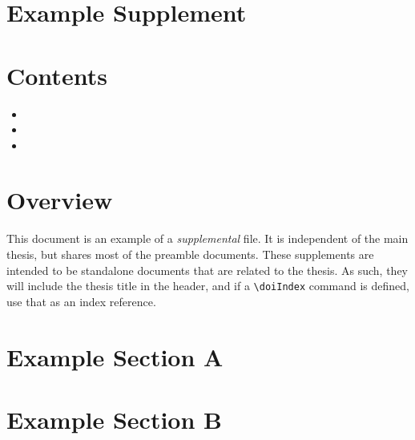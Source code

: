 \documentclass[hidelinks,a4paper,11pt,openany]{article}
\newcommand{\supplementName}{Example Supplement}
\begin{document}
\section*{\supplementName}




\section*{Contents}
\begin{itemize}
	\item {}
	\item {}
	\item {}
\end{itemize}


\section{Overview}
\label{\labelOverview}

This document is an example of a \textit{supplemental} file.  It is independent of the main thesis, but shares most of the preamble documents.  These supplements are intended to be standalone documents that are related to the thesis.  As such, they will include the thesis title in the header, and if a \texttt{{\textbackslash}doiIndex} command is defined, use that as an index reference.



\section{Example Section A}
\label{\labelA}

\lipsum[1-3]


\section{Example Section B}
\label{\labelB}

\lipsum[6]



\end{document}
